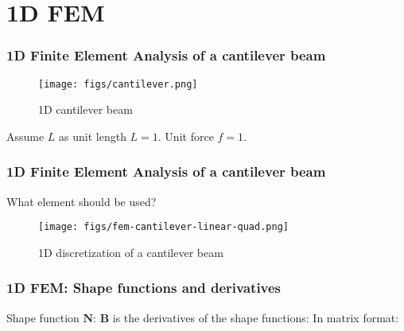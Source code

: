 \documentclass[notes]{beamer}
\begin{document}
\section{1D FEM}
\begin{frame}
\frametitle{1D Finite Element Analysis of a cantilever beam}
\begin{figure}[ht]
	\centering
	\texttt{[image: figs/cantilever.png]}
	\caption*{1D cantilever beam}
\end{figure}
Assume $L$ as unit length $L = 1$. Unit force $f = 1$.
\end{frame}

\begin{frame}
\frametitle{1D Finite Element Analysis of a cantilever beam}
What element should be used?
\begin{figure}[ht]
	\centering
	\texttt{[image: figs/fem-cantilever-linear-quad.png]}
	\caption*{1D discretization of a cantilever beam}
\end{figure}
\end{frame}

\begin{frame}
\frametitle{1D FEM: Shape functions and derivatives}
Shape function $\mathbf{N}$:
$\mathbf{B}$ is the derivatives of the shape functions:
In matrix format: 
\end{frame}
\end{document}
